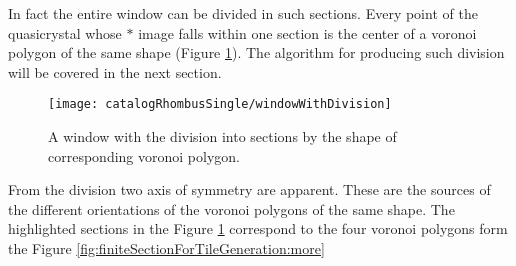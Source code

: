 \documentclass[text.tex]{subfiles}
\begin{document}
In fact the entire window can be divided in such sections. Every point of the quasicrystal whose $\ast$ image falls within one section is the center of a voronoi polygon of the same shape (Figure \ref{fig:windowWithDivision}). The algorithm for producing such division will be covered in the next section.  

\begin{figure}[h]
\centering
\texttt{[image: catalogRhombusSingle/windowWithDivision]}
\caption{A window with the division into sections by the shape of corresponding voronoi polygon.}
\label{fig:windowWithDivision}
\end{figure}

From the division two axis of symmetry are apparent. These are the sources of the different orientations of the voronoi polygons of the same shape. The highlighted sections in the Figure \ref{fig:windowWithDivision} correspond to the four voronoi polygons form the Figure \ref{fig:finiteSectionForTileGeneration:more}
\end{document}
